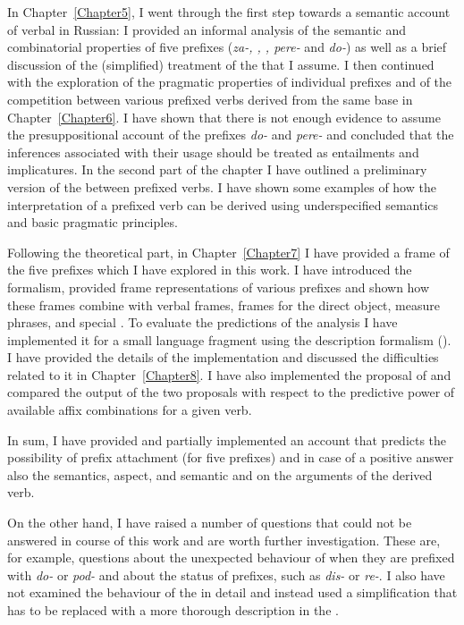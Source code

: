 In Chapter~\ref{Chapter5}, I went through the first step towards a semantic account of verbal  in Russian: I provided an informal analysis of the semantic and combinatorial properties of five prefixes (\textit{za-, , , pere-} and \textit{do-}) as well as a brief discussion of the (simplified) treatment of the  that I assume. I then continued with the exploration of the pragmatic properties of individual prefixes and of the competition between various prefixed verbs derived from the same base in Chapter~\ref{Chapter6}. I have shown that there is not enough evidence to assume the presuppositional account of the prefixes \textit{do-} and \textit{pere-} and concluded that the inferences associated with their usage should be treated as entailments and implicatures. In the second part of the chapter I have outlined a preliminary version of the  between prefixed verbs. I have shown some examples of how the interpretation of a prefixed verb can be derived using underspecified semantics and basic pragmatic principles. 

Following the theoretical part,  in Chapter~\ref{Chapter7} I have provided a frame  of the five prefixes which I have explored in this work. I have introduced the formalism, provided frame representations of various prefixes and shown how these frames combine with verbal frames, frames for the direct object, measure phrases, and special . To evaluate the predictions of the analysis I have implemented it for a small language fragment using the  description formalism (). I have provided the details of the implementation and discussed the difficulties related to it in Chapter~\ref{Chapter8}. I have also implemented the proposal of \citet{Tatevosov:09} and compared the output of the two proposals with respect to the predictive power of available affix combinations for a given verb. 

In sum, I have provided and partially implemented an account that predicts the possibility of prefix attachment (for five prefixes) and in case of a positive answer also the semantics, aspect, and semantic and  on the arguments of the derived verb. 

On the other hand, I have raised a number of questions that could not be answered in course of this work and are worth further investigation. These are, for example, questions about the unexpected behaviour of   when they are prefixed with \textit{do-} or \textit{pod-} and about the status of  prefixes, such as \textit{dis-} or \textit{re-}. I also have not examined the behaviour of the  in detail and instead used a simplification that has to be replaced with a more thorough description in the . 

